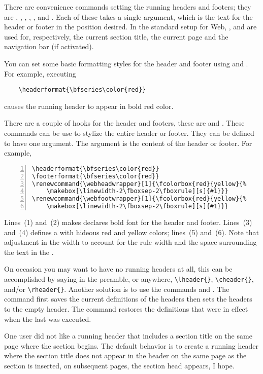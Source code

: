 \documentclass{article}
\renewcommand{\webheadwrapper}[1]{%
    \hspace{-\oddsidemargin}%
    \makebox[\totaltextwidth][s]{#1}\hss
}
\def\Web{\textsf{Web}}
\begin{document}
There are convenience commands setting  the running headers and
footers; they are , , ,
, , and . Each of these takes a
single argument, which is the text for the header or footer in the
position desired. In the  standard setup for {\Web}, ,
 and  are used for, respectively, the
current section title, the current page and the navigation bar (if
activated).

You can set some basic formatting styles for the header and footer using
 and . For example, executing
\begin{verbatim}
    \headerformat{\bfseries\color{red}}
\end{verbatim}
causes the running header to appear in bold red color.

There are a couple of hooks for the header and footers, these are
 and . These commands can be
use to stylize the entire header or footer. They can be defined to have
one argument. The argument is the content of the header or footer. For example,
\begin{Verbatim}[numbers=left,xleftmargin=20pt,fontsize=\small]
\headerformat{\bfseries\color{red}}
\footerformat{\bfseries\color{red}}
\renewcommand{\webheadwrapper}[1]{\fcolorbox{red}{yellow}{%
    \makebox[\linewidth-2\fboxsep-2\fboxrule][s]{#1}}}
\renewcommand{\webfootwrapper}[1]{\fcolorbox{red}{yellow}{%
    \makebox[\linewidth-2\fboxsep-2\fboxrule][s]{#1}}}
\end{Verbatim}
\newtopic Lines~(1) and~(2) makes declares bold font for the header and footer.
Lines~(3) and~(4) defines a  with hideous red and yellow colors;
lines~(5) and~(6). Note that adjustment in the width to account for the 
rule width and the space surrounding the text in the .

\newtopic On occasion you may want to have no running headers at all, this can
be accomplished by saying in the preamble, or anywhere,
\verb!\lheader{}!, \verb!\cheader{}!, and/or \verb!\rheader{}!.
Another solution is to use the commands  and
. The command  first saves the current
definitions of the headers then sets the headers to the empty
header. The command  restores the definitions that were in
effect when the last  was executed.

\newtopic
One user did not like a running header that includes a section title
on the same page where the section begins. The default behavior is
to create a running header where the section title does not appear
in the header on the same page as the section is inserted, on
subsequent pages, the section head appears, I hope.
\end{document}
